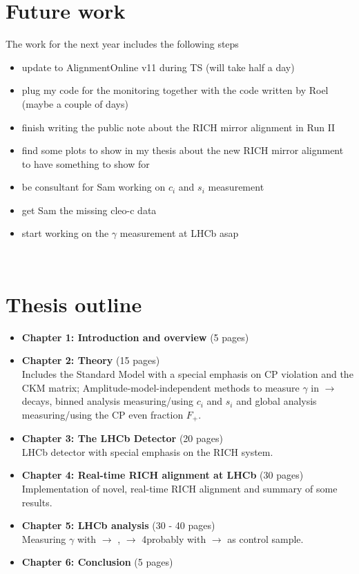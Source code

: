 \section{Future work}
The work for the next year includes the following steps
\begin{itemize}
\item update to AlignmentOnline v11 during TS (will take half a day) 
\item plug my code for the monitoring together with the code written by Roel (maybe a couple of days)
\item finish writing the public note about the RICH mirror alignment in Run II 
\item find some plots to show in my thesis about the new RICH mirror alignment to have something to show for 
\item be consultant for Sam working on $c_i$ and $s_i$ measurement
\item get Sam the missing cleo-c data
\item start working on the $\gamma$ measurement at LHCb asap
\end{itemize}

\\

\section{Thesis outline}
\begin{itemize}
\item \textbf{Chapter 1: Introduction and overview} (5 pages)\\
\item \textbf{Chapter 2: Theory} (15 pages)\\
	Includes the Standard Model with a special emphasis on CP violation and the CKM matrix; Amplitude-model-independent methods to measure $\gamma$ in \B $\rightarrow$ \D \kaon decays, binned analysis measuring/using $c_i$ and $s_i$ and global analysis measuring/using the CP even fraction $F_+$.
\item \textbf{Chapter 3: The LHCb Detector} (20 pages)\\
LHCb detector with special emphasis on the RICH system.\\
\item \textbf{Chapter 4: Real-time RICH alignment at LHCb} (30 pages)\\
Implementation of novel, real-time RICH alignment and summary of some results.\\
\item \textbf{Chapter 5: LHCb analysis} (30 - 40 pages)\\
Measuring $\gamma$ with \B $\rightarrow$ \D \kaon , \D $\rightarrow$ 4\pion probably with \B $\rightarrow$ \D \pion as control sample.
\item \textbf{Chapter 6: Conclusion }(5 pages)
\end{itemize}